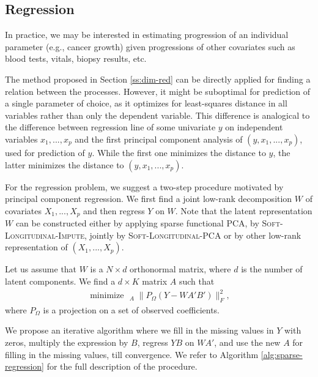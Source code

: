\documentclass[preprint]{imsart}
\numberwithin{equation}{section}
\theoremstyle{plain}
\DeclareMathOperator*{\minimize}{minimize\ \ }
\begin{document}
\subsection{Regression}\label{ss:regression}

In practice, we may be interested in estimating progression of an individual parameter (e.g., cancer growth) given progressions of other covariates such as blood tests, vitals, biopsy results, etc.

The method proposed in Section \ref{ss:dim-red} can be directly applied for finding a relation between the processes. However, it might be suboptimal for prediction of a single parameter of choice, as it optimizes for least-squares distance in all variables rather than only the dependent variable. This difference is analogical to the difference between regression line of some univariate $y$ on independent variables $x_1,...,x_p$ and the first principal component analysis of $(y,x_1,...,x_p)$, used for prediction of $y$. While the first one minimizes the distance to $y$, the latter minimizes the distance to $(y,x_1,...,x_p)$.


For the regression problem, we suggest a two-step procedure motivated by principal component regression. We first find a joint low-rank decomposition $W$ of covariates $X_1,...,X_p$ and then regress $Y$ on $W$. Note that the latent representation $W$ can be constructed either by applying sparse functional PCA, by \textsc{Soft-Longitudinal-Impute}, jointly by \textsc{Soft-Longitudinal-PCA} or by other low-rank representation of $(X_1,...,X_p)$.

Let us assume that $W$ is a $N \times d$ orthonormal matrix, where $d$ is the number of latent components. We find a $d \times K$ matrix $A$ such that
\begin{align}\label{eq:pcr}
\minimize_A \|P_\Omega(Y - WA'B')\|_F^2,
\end{align}
where $P_\Omega$ is a projection on a set of observed coefficients.

We propose an iterative algorithm where we fill in the missing values in $Y$ with zeros, multiply the expression by $B$, regress $YB$ on $WA'$, and use the new $A$ for filling in the missing values, till convergence. We refer to Algorithm \ref{alg:sparse-regression} for the full description of the procedure.
\end{document}
